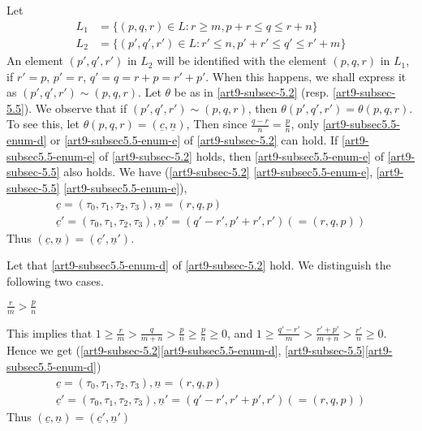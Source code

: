 \subsection{}\label{art9-subsec-5.7}
Let
\begin{align*}
L_{1} &= \{(p,q,r) \in L : r \geq m ,p + r \leq q \leq r+ n\}\\
L_{2} &=\{(p',q',r') \in L : r' \leq n, p' + r' \leq q' \leq r' +m \}
\end{align*}
An element $(p',q',r')$ in $L_{2}$ will be identified with the element $(p,q,r)$ in $L_{1}$, if $r' =p$, $p'=r$, $q' = q =r +p =r' +p'$. When this happens, we shall express it as $(p',q',r')\sim(p,q,r)$. Let $\theta$ be as in
\ref{art9-subsec-5.2} (resp. \ref{art9-subsec-5.5}). We observe that if $(p',q',r')\sim (p,q,r)$, then $\theta(p',q', r')= \theta(p,q,r)$. To see this, let $\theta(p,q,r) = (\underline{c},\underline{n})$, Then since $\frac{q-r}{n} = \frac{p}{n}$, only \eqref{art9-subsec5.5-enum-d} or \eqref{art9-subsec5.5-enum-e} of \ref{art9-subsec-5.2} can hold. If \eqref{art9-subsec5.5-enum-e} of \ref{art9-subsec-5.2} holds, then \eqref{art9-subsec5.5-enum-e} of \ref{art9-subsec-5.5} also holds. We have (\ref{art9-subsec-5.2} \eqref{art9-subsec5.5-enum-e}, \ref{art9-subsec-5.5} \eqref{art9-subsec5.5-enum-e}),
\begin{gather*}
\underline{c}= (\tau_{0}, \tau_{1}, \tau_{2}, \tau_{3}), \underline{n} = (r,q, p)\\
\underline{c}' = (\tau_{0}, \tau_{1}, \tau_{2}, \tau_{3}), \underline{n}' = (q'-r', p'+r',r')(=(r,q,p))
\end{gather*}
Thus $(\underline{c}, \underline{n}) = (\underline{c}', \underline{n}')$.

Let that \eqref{art9-subsec5.5-enum-d} of \ref{art9-subsec-5.2} hold. We distinguish the following two cases.

\setcounter{case}{0}
\begin{case}\label{art9-5.7-case-1}
$\frac{r}{m} > \frac{p}{n}$

This implies that $1 \geq \frac{r}{m} > \frac{q}{m+n} > \frac{p}{n} \geq \frac{p}{n}\geq  0$, and $1 \geq \frac{q'-r'}{m} > \frac{r'+p'}{m+n} > \frac{r'}{n} \geq 0$.
Hence we get (\ref{art9-subsec-5.2}\eqref{art9-subsec5.5-enum-d}, \ref{art9-subsec-5.5}\eqref{art9-subsec5.5-enum-d})
\begin{gather*}
\underline{c} = (\tau_{0}, \tau_{1}, \tau_{2}, \tau_{3}), \underline{n}= (r, q, p)\\
\underline{c}' = (\tau_{0}, \tau_{1}, \tau_{2}, \tau_{3}), \underline{n}'= (q'-r',r'+p',r')(=(r,q, p))
\end{gather*}
Thus $(\underline{c}, \underline{n})=(\underline{c}', \underline{n}')$
\end{case}

